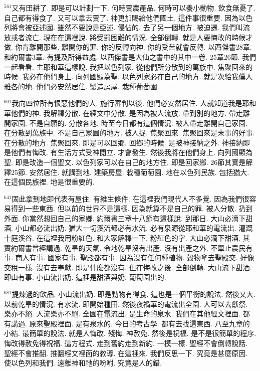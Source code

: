 \documentclass{book}
\begin{document}
$^{561}$又有田耕了.
即是可以計劃一下.
何時賣農產品.
何時可以養小動物.
飲食無憂了.
自己都有得食了.
又可以拿去賣了.
神更加賜給他們國土.
這件事很重要.
因為以色列將會被亞述國.
雖然不要說是亞述.
侵佔的.
去了另一個地方.
被迫遷.
我們叫流放或者流亡.
現在在這裡說.
將受罰困難的情況.
全部倒轉.
就是人要悔改的時候才做.
你肯離開那些.
離開你的罪.
你的反轉向神.
你的受苦就會反轉.
以西傑書28章.
和約爾書3章.
有提及所得益處.
以西傑書是大仙之書中的其中一卷.
25章26節.
我們一起看看.
主耶和華這樣說.
我把以色列家.
從他們所分散到的萬族中.
焦聚回來的時候.
我必在他們身上.
向列國顯為聖.
以色列家必在自己的地方.
就是次給我僕人雅各的地.
他們必安然居住.
製造房屋.
栽種葡萄園.

$^{601}$我向四位所有恨惡他們的人.
施行審判以後.
他們必安然居住.
人就知道我是耶和華他們的神.
我解釋分散.
在經文中分散.
是因為被人流放.
帶到別的地方.
帶走離開家園.
不是自願的.
分散各地.
時至今日都有這個情況.
被人帶走離開自己家園.
在分散到萬族中.
不是自己家園的地方.
被人捉.
焦聚回來.
焦聚回來是末事的好事.
在分散的地方.
焦聚回來.
即是可以回鄉.
回鄉的時候.
是被神接納之外.
神接納即是他們有悔改.
有生活方式受神閱立.
才會發生.
然後我將在他們身上.
向列國顯為聖.
即是改造一個聖文.
以色列家可以在自己的地方住.
即是回家鄉.
26節其實是解釋25節.
安然居住.
就講到地.
建築房屋.
栽種葡萄園.
地在以色列民族.
包括猶大.
在這個民族裡.
地是很重要的.

$^{641}$固此拿到地即代表有屋住.
有維生條件.
在這裡我們現代人不多覺.
因為我們很容易得到一些東西.
但以前的世界不是這樣.
因為就算不是自己的罪.
被人分散.
扔到外面.
你當然想回自己的家鄉.
約爾書三章十八節有這樣說.
到那日.
大山必滴下甜酒.
小山都必流出奶.
猶大一切溪流都必有水流.
必有泉源從耶和華的電流出.
灌溉十庭溪谷.
在這裡我用粉紅色.
和大家解釋一下.
粉紅色的字.
大山必滴下甜酒.
其實約爾書曾經講過.
乾旱的天氣.
令地乾旱沒有出產.
沒有出產之外.
不單止農民有事.
商人有事.
國家有事.
聖殿都有事.
因為沒有任何種植物.
穀物拿去聖殿交.
好像交稅一樣.
沒有去奉獻.
即是什麼都沒有.
但在悔改之後.
全部倒轉.
大山流下甜酒.
即山有事.
小山流出奶.
這裡是甜酒與奶.
葡萄園出的.

$^{681}$提煉過的飲品.
小山流出奶.
即是動物有得食.
這也是一個平衡的說法.
然後又大.
以前乾旱的情況.
有水流.
即開始種田.
然後夜禍華的電流出全園.
人可以去獻祭.
樂亦不絕.
人流樂亦不絕.
全園在電流出.
是生命的泉水.
我們在其他經文裡面.
都有講過.
原來聖殿裡面.
是有泉水的.
今日的考古學.
都有去找這東西.
八至九章的小結.
最簡單的說法.
就是人悔改.
殘悔.
神赦免.
然後是祝福.
是不是很簡單的程序.
悔改得赦免得祝福.
這方程式.
走到舊約走到新約.
一模一樣.
聖經不會倒轉說話.
聖經不會推翻.
推翻經文裡面的教導.
在這裡來.
我們反思一下.
究竟是甚麼原因.
使以色列和我們.
遠離神和祂的吩咐.
究竟是人的錯.
\end{document}
